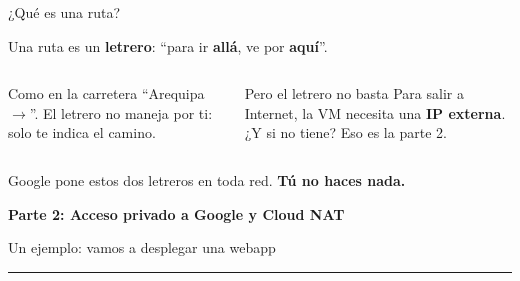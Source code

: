 \documentclass[aspectratio=169,10pt,c]{beamer}
\newcommand{\separador}[2]{%
\begin{frame}[plain]
\vfill
\begin{center}
{\fontsize{29}{34}\selectfont\bfseries #1}\par
\vspace{2mm}
{\small #2}\par
\vspace{4mm}
{\color{utpRojo}\rule{8.5cm}{1.2pt}}
\end{center}
\vfill
\end{frame}}
\begin{document}
\begin{frame}{¿Qué es una ruta?}
\begin{center}
{\Large Una ruta es un \textbf{letrero}: ``para ir \textbf{allá}, ve por \textbf{aquí}''.}
\end{center}
\vspace{1mm}
\begin{center}
\end{center}
\begin{columns}[T,onlytextwidth]
\begin{exampleblock}{Como en la carretera}
\small ``Arequipa $\rightarrow$''. El letrero no maneja por ti: solo te indica el camino.
\end{exampleblock}
\begin{alertblock}{Pero el letrero no basta}
\small Para salir a Internet, la VM necesita una \textbf{IP externa}. ¿Y si no tiene? Eso es la parte 2.
\end{alertblock}
\end{columns}
\par\vspace{2mm}
\centering\small Google pone estos dos letreros en toda red. \textbf{Tú no haces nada.}
\end{frame}

\separador{Parte 2: Acceso privado a Google y Cloud NAT}{Un ejemplo: vamos a desplegar una webapp}
\end{document}
